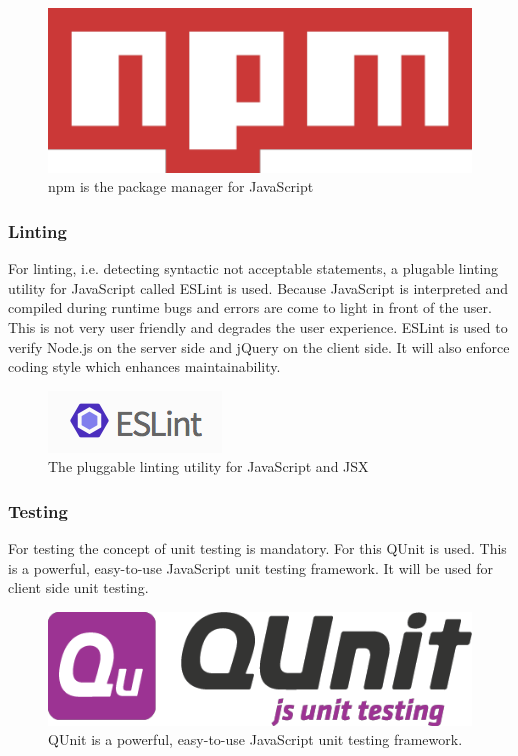 \begin{figure}[h]
  \begin{center}
    \includegraphics[scale=0.2]{./images/npm.png}
    \caption{npm is the package manager for JavaScript}
    \label{fig:}
  \end{center}
\end{figure}

\subsubsection{Linting}
For linting, i.e. detecting syntactic not acceptable statements, a plugable linting utility for JavaScript called ESLint is used. Because JavaScript is interpreted and compiled during runtime bugs and errors are come to light in front of the user. This is not very user friendly and degrades the user experience. ESLint is used to verify Node.js on the server side and jQuery on the client side. It will also enforce coding style which enhances maintainability. 

\begin{figure}[h]
  \begin{center}
    \includegraphics[scale=0.5]{./images/eslint.png}
    \caption{The pluggable linting utility for JavaScript and JSX}
    \label{fig:}
  \end{center}
\end{figure}

\subsubsection{Testing}
For testing the concept of unit testing is mandatory. For this QUnit is used. This is a powerful, easy-to-use JavaScript unit testing framework. It will be used for client side unit testing.

\begin{figure}[h]
  \begin{center}
    \includegraphics[scale=0.2]{./images/qu.png}
    \caption{QUnit is a powerful, easy-to-use JavaScript unit testing framework. }
    \label{fig:}
  \end{center}
\end{figure}


